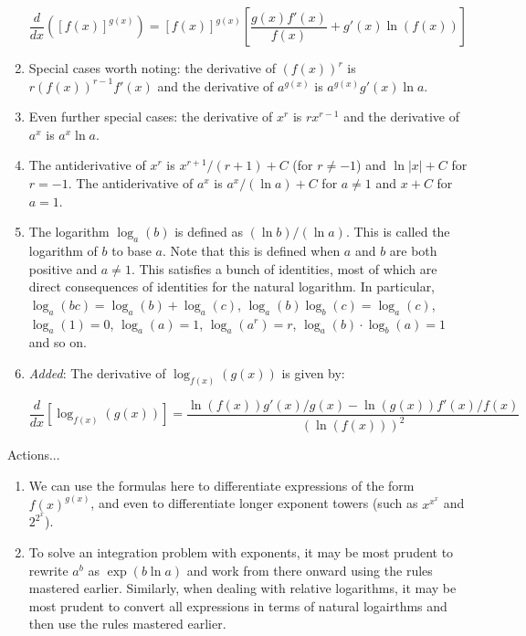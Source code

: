 \documentclass[10pt]{amsart}
\begin{document}
\begin{enumerate}
  $$\frac{d}{dx} \left([f(x)]^{g(x)}\right) = [f(x)]^{g(x)}\left[\frac{g(x)f'(x)}{f(x)} + g'(x)\ln(f(x))\right]$$
\item Special cases worth noting: the derivative of $(f(x))^r$ is
  $r(f(x))^{r-1}f'(x)$ and the derivative of $a^{g(x)}$ is
  $a^{g(x)}g'(x) \ln a$.
\item Even further special cases: the derivative of $x^r$ is
  $rx^{r-1}$ and the derivative of $a^x$ is $a^x \ln a$.
\item The antiderivative of $x^r$ is $x^{r+1}/(r + 1) + C$ (for $r \ne
  -1$) and $\ln|x| + C$ for $r = -1$. The antiderivative of $a^x$ is
  $a^x/(\ln a) + C$ for $a \ne 1$ and $x + C$ for $a = 1$.
\item The logarithm $\log_a(b)$ is defined as $(\ln b)/(\ln a)$. This
  is called the logarithm of $b$ to base $a$. Note that this is
  defined when $a$ and $b$ are both positive and $a \ne 1$. This
  satisfies a bunch of identities, most of which are direct
  consequences of identities for the natural logarithm. In particular,
  $\log_a(bc) = \log_a(b) + \log_a(c)$, $\log_a(b)\log_b(c) =
  \log_a(c)$, $\log_a(1) = 0$, $\log_a(a) = 1$, $\log_a(a^r) = r$,
  $\log_a(b) \cdot \log_b(a) = 1$ and so on.
\item {\em Added}: The derivative of $\log_{f(x)}(g(x))$ is given by:

  $$\frac{d}{dx}\left[\log_{f(x)}(g(x))\right] = \frac{\ln(f(x))g'(x)/g(x) - \ln(g(x))f'(x)/f(x)}{(\ln(f(x)))^2}$$
\end{enumerate}

Actions...

\begin{enumerate}
\item We can use the formulas here to differentiate expressions of the
  form $f(x)^{g(x)}$, and even to differentiate longer exponent towers
  (such as $x^{x^x}$ and $2^{2^x}$).
\item To solve an integration problem with exponents, it may be most
  prudent to rewrite $a^b$ as $\exp(b \ln a)$ and work from there
  onward using the rules mastered earlier. Similarly, when dealing
  with relative logarithms, it may be most prudent to convert all
  expressions in terms of natural logairthms and then use the rules
  mastered earlier.
\end{enumerate}
\end{document}
